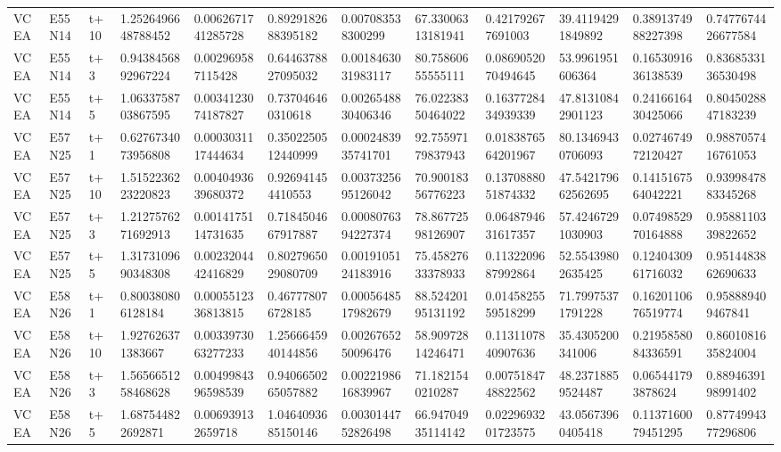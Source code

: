 \begin{landscape}
\begin{longtable}{llllllllllll}
VCEA & E55N14 & t+10 & 1.2526496648788452 & 0.0062671741285728 & 0.8929182688395182 & 0.007083538300299 & 67.33006313181941 & 0.421792677691003 & 39.41194291849892 & 0.3891374988227398 & 0.7477674426677584 \\
VCEA & E55N14 & t+3 & 0.9438456892967224 & 0.002969587115428 & 0.6446378827095032 & 0.0018463031983117 & 80.75860655555111 & 0.0869052070494645 & 53.9961951606364 & 0.1653091636138539 & 0.8368533136530498 \\
VCEA & E55N14 & t+5 & 1.0633758703867595 & 0.0034123074187827 & 0.737046460310618 & 0.0026548830406346 & 76.02238350464022 & 0.1637728434939339 & 47.81310842901123 & 0.2416616430425066 & 0.8045028847183239 \\
VCEA & E57N25 & t+1 & 0.6276734073956808 & 0.0003031117444634 & 0.3502250512440999 & 0.0002483935741701 & 92.75597179837943 & 0.0183876564201967 & 80.13469430706093 & 0.0274674972120427 & 0.9887057416761053 \\
VCEA & E57N25 & t+10 & 1.5152236223220823 & 0.0040493639680372 & 0.926941454410553 & 0.0037325695126042 & 70.90018356776223 & 0.1370888051874332 & 47.542179662562695 & 0.1415167564042221 & 0.9399847883345268 \\
VCEA & E57N25 & t+3 & 1.2127576271692913 & 0.0014175114731635 & 0.7184504667917887 & 0.0008076394227374 & 78.86772598126907 & 0.0648794631617357 & 57.42467291030903 & 0.0749852970164888 & 0.9588110339822652 \\
VCEA & E57N25 & t+5 & 1.3173109690348308 & 0.0023204442416829 & 0.8027965029080709 & 0.0019105124183916 & 75.45827633378933 & 0.1132209687992864 & 52.55439802635425 & 0.1240430961716032 & 0.9514483862690633 \\
VCEA & E58N26 & t+1 & 0.800380806128184 & 0.0005512336813815 & 0.467778076728185 & 0.0005648517982679 & 88.52420195131192 & 0.0145825559518299 & 71.79975371791228 & 0.1620110676519774 & 0.958889409467841 \\
VCEA & E58N26 & t+10 & 1.927626371383667 & 0.0033973063277233 & 1.2566645940144856 & 0.0026765250096476 & 58.90972814246471 & 0.1131107840907636 & 35.4305200341006 & 0.2195858084336591 & 0.8601081635824004 \\
VCEA & E58N26 & t+3 & 1.5656651258468628 & 0.0049984396598539 & 0.9406650265057882 & 0.0022198616839967 & 71.1821540210287 & 0.0075184748822562 & 48.23718859524487 & 0.065441793878624 & 0.8894639198991402 \\
VCEA & E58N26 & t+5 & 1.687544822692871 & 0.006939132659718 & 1.0464093685150146 & 0.0030144752826498 & 66.94704935114142 & 0.0229693201723575 & 43.05673960405418 & 0.1137160079451295 & 0.8774994377296806 \\
\bottomrule
\end{longtable}
\end{landscape}

